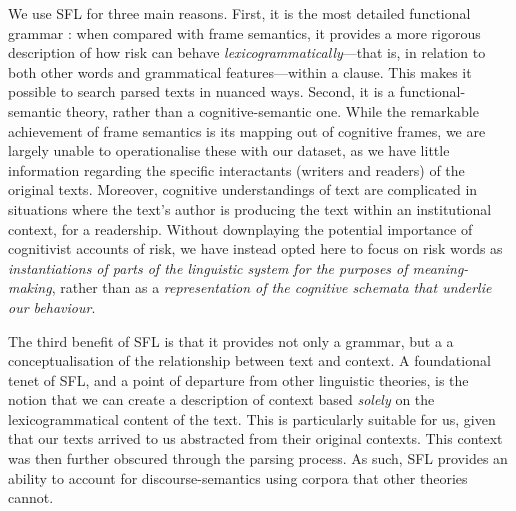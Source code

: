 We use SFL for three main reasons. First, it is the most detailed functional grammar \cite{eggins_analysing_2004}: when compared with frame semantics, it provides a more rigorous description of how risk can behave \emph{lexicogrammatically}---that is, in relation to both other words and grammatical features---within a clause. This makes it possible to search parsed texts in nuanced ways. Second, it is a functional-semantic theory, rather than a cognitive-semantic one. While the remarkable achievement of frame semantics is its mapping out of cognitive frames, we are largely unable to operationalise these with our dataset, as we have little information regarding the specific interactants (writers and readers) of the original texts. Moreover, cognitive understandings of text are complicated in situations where the text's author is producing the text within an institutional context, for a readership. Without downplaying the potential importance of cognitivist accounts of risk, we have instead opted here to focus on risk words as \emph{instantiations of parts of the linguistic system for the purposes of meaning-making}, rather than as a \emph{representation of the cognitive schemata that underlie our behaviour}.

The third benefit of SFL is that it provides not only a grammar, but a a conceptualisation of the relationship between text and context. A foundational tenet of SFL, and a point of departure from other linguistic theories, is the notion that we can create a description of context based \emph{solely} on the lexicogrammatical content of the text. This is particularly suitable for us, given that our texts arrived to us abstracted from their original contexts. This context was then further obscured through the parsing process. As such, SFL provides an ability to account for discourse-semantics using corpora that other theories cannot.










